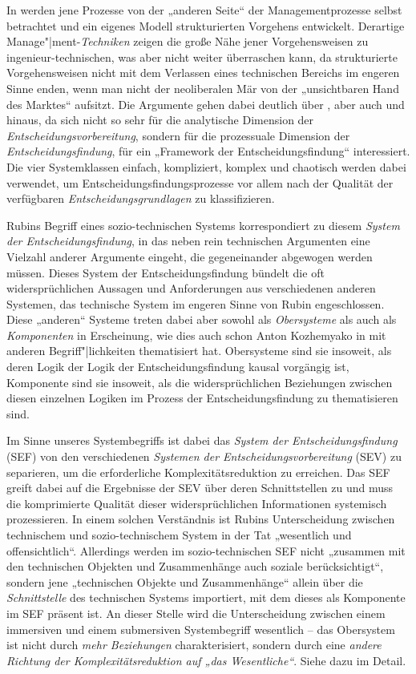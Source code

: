 \documentclass[12pt,a4paper]{article}
\begin{document}
In \cite{Snowden2007} werden jene Prozesse von der „anderen Seite“ der
Managementprozesse selbst betrachtet und ein eigenes Modell strukturierten
Vorgehens entwickelt. Derartige Manage"|ment-\emph{Techniken} zeigen die große
Nähe jener Vorgehensweisen zu ingenieur-technischen, was aber nicht weiter
überraschen kann, da strukturierte Vorgehensweisen nicht mit dem Verlassen
eines technischen Bereichs im engeren Sinne enden, wenn man nicht der
neoliberalen Mär von der „unsichtbaren Hand des Marktes“ aufsitzt. Die
Argumente gehen dabei deutlich über \cite{Mann2019}, aber auch
\cite{Foxon2009} und \cite{Geels2007} hinaus, da sich \cite{Snowden2007} nicht
so sehr für die analytische Dimension der \emph{Entscheidungsvorbereitung},
sondern für die prozessuale Dimension der \emph{Entscheidungsfindung}, für ein
„Framework der Entscheidungsfindung“ interessiert. Die vier Systemklassen
einfach, kompliziert, komplex und chaotisch werden dabei verwendet, um
Entscheidungsfindungsprozesse vor allem nach der Qualität der verfügbaren
\emph{Entscheidungsgrundlagen} zu klassifizieren.

Rubins Begriff eines sozio-technischen Systems korrespondiert zu diesem
\emph{System der Entscheidungsfindung}, in das neben rein technischen
Argumenten eine Vielzahl anderer Argumente eingeht, die gegeneinander
abgewogen werden müssen. Dieses System der Entscheidungsfindung bündelt die
oft widersprüchlichen Aussagen und Anforderungen aus verschiedenen anderen
Systemen, das technische System im engeren Sinne von Rubin engeschlossen.
Diese „anderen“ Systeme treten dabei aber sowohl als \emph{Obersysteme} als
auch als \emph{Komponenten} in Erscheinung, wie dies auch schon Anton
Kozhemyako in \cite{Kozhemyako2019} mit anderen Begriff"|lichkeiten
thematisiert hat.  Obersysteme sind sie insoweit, als deren Logik der Logik
der Entscheidungsfindung kausal vorgängig ist, Komponente sind sie insoweit,
als die widersprüchlichen Beziehungen zwischen diesen einzelnen Logiken im
Prozess der Entscheidungsfindung zu thematisieren sind.

Im Sinne unseres Systembegriffs ist dabei das \emph{System der
  Entscheidungsfindung} (SEF) von den verschiedenen \emph{Systemen der
  Entscheidungsvorbereitung} (SEV) zu separieren, um die erforderliche
Komplexitätsreduktion zu erreichen. Das SEF greift dabei auf die Ergebnisse
der SEV über deren Schnittstellen zu und muss die komprimierte Qualität dieser
widersprüchlichen Informationen systemisch prozessieren.  In einem solchen
Verständnis ist Rubins Unterscheidung zwischen technischem und
sozio-technischem System in der Tat „wesentlich und offensichtlich“.
Allerdings werden im sozio-technischen SEF nicht „zusammen mit den technischen
Objekten und Zusammenhänge auch soziale berücksichtigt“, sondern jene
„technischen Objekte und Zusammenhänge“ allein über die \emph{Schnittstelle}
des technischen Systems importiert, mit dem dieses als Komponente im SEF
präsent ist. An dieser Stelle wird die Unterscheidung zwischen einem
immersiven und einem submersiven Systembegriff wesentlich -- das Obersystem
ist nicht durch \emph{mehr Beziehungen} charakterisiert, sondern durch eine
\emph{andere Richtung der Komplexitätsreduktion auf „das Wesentliche“}.  Siehe
dazu \cite{Graebe2020a} im Detail.  
\end{document}
